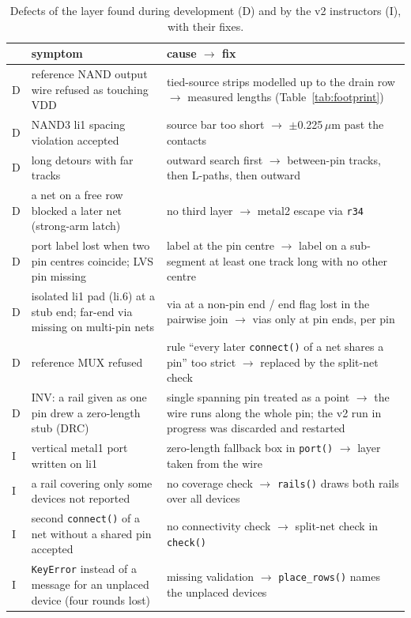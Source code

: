 \documentclass[conference]{IEEEtran}
\newcommand{\um}{\,$\mu$m}
\newcommand{\code}[1]{\texttt{#1}}
\begin{document}
\begin{table}[t]
\caption{Defects of the layer found during development (D) and by the v2 instructors (I), with their fixes.}
\label{tab:defects}
\centering\footnotesize
\begin{tabular}{@{}L{0.03\columnwidth}L{0.42\columnwidth}L{0.46\columnwidth}@{}}
\toprule
& symptom & cause $\rightarrow$ fix \\
\midrule
D & reference NAND output wire refused as touching VDD & tied-source strips modelled up to the drain row $\rightarrow$ measured lengths (Table~\ref{tab:footprint}) \\
D & NAND3 li1 spacing violation accepted & source bar too short $\rightarrow$ $\pm$0.225\um{} past the contacts \\
D & long detours with far tracks & outward search first $\rightarrow$ between-pin tracks, then L-paths, then outward \\
D & a net on a free row blocked a later net (strong-arm latch) & no third layer $\rightarrow$ metal2 escape via \code{r34} \\
D & port label lost when two pin centres coincide; LVS pin missing & label at the pin centre $\rightarrow$ label on a sub-segment at least one track long with no other centre \\
D & isolated li1 pad (li.6) at a stub end; far-end via missing on multi-pin nets & via at a non-pin end / end flag lost in the pairwise join $\rightarrow$ vias only at pin ends, per pin \\
D & reference MUX refused & rule ``every later \code{connect()} of a net shares a pin'' too strict $\rightarrow$ replaced by the split-net check \\
D & INV: a rail given as one pin drew a zero-length stub (DRC) & single spanning pin treated as a point $\rightarrow$ the wire runs along the whole pin; the v2 run in progress was discarded and restarted \\
I & vertical metal1 port written on li1 & zero-length fallback box in \code{port()} $\rightarrow$ layer taken from the wire \\
I & a rail covering only some devices not reported & no coverage check $\rightarrow$ \code{rails()} draws both rails over all devices \\
I & second \code{connect()} of a net without a shared pin accepted & no connectivity check $\rightarrow$ split-net check in \code{check()} \\
I & \code{KeyError} instead of a message for an unplaced device (four rounds lost) & missing validation $\rightarrow$ \code{place\_rows()} names the unplaced devices \\
\bottomrule
\end{tabular}
\end{table}
\end{document}
